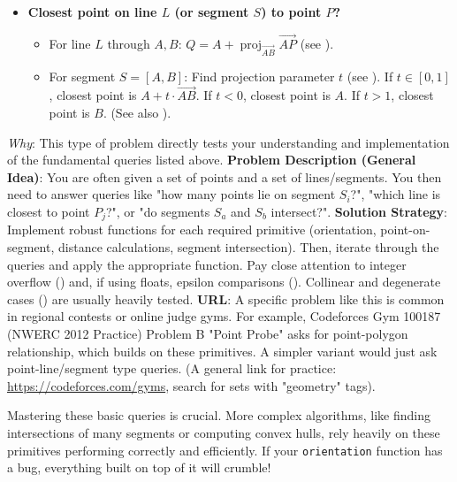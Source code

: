 \begin{pattern}
\begin{itemize}
\begin{itemize}
        \end{itemize}
    \item \textbf{Closest point on line $L$ (or segment $S$) to point $P$?}
        \begin{itemize}
            \item For line $L$ through $A,B$: $Q = A + \operatorname{proj}_{\vec{AB}} \vec{AP}$ (see ).
            \item For segment $S=[A,B]$: Find projection parameter $t$ (see ). If $t \in [0,1]$, closest point is $A + t \cdot \vec{AB}$. If $t<0$, closest point is $A$. If $t>1$, closest point is $B$. (See also ).
        \end{itemize}
    \end{itemize}
\end{pattern}

\begin{problemexample}
\label{probex:A.4.1.cf_points_lines}
\textit{Why}: This type of problem directly tests your understanding and implementation of the fundamental queries listed above.
\textbf{Problem Description (General Idea)}: You are often given a set of points and a set of lines/segments. You then need to answer queries like "how many points lie on segment $S_i$?", "which line is closest to point $P_j$?", or "do segments $S_a$ and $S_b$ intersect?".
\textbf{Solution Strategy}: Implement robust functions for each required primitive (orientation, point-on-segment, distance calculations, segment intersection). Then, iterate through the queries and apply the appropriate function. Pay close attention to integer overflow () and, if using floats, epsilon comparisons (). Collinear and degenerate cases () are usually heavily tested.
\textbf{URL}: A specific problem like this is common in regional contests or online judge gyms. For example, Codeforces Gym 100187 (NWERC 2012 Practice) Problem B "Point Probe" asks for point-polygon relationship, which builds on these primitives. A simpler variant would just ask point-line/segment type queries.
(A general link for practice: \url{https://codeforces.com/gyms}, search for sets with "geometry" tags).
\end{problemexample}

\begin{insight}
\label{insight:A.4.1.primitives_as_building_blocks}
Mastering these basic queries is crucial. More complex algorithms, like finding intersections of many segments or computing convex hulls, rely heavily on these primitives performing correctly and efficiently. If your \texttt{orientation} function has a bug, everything built on top of it will crumble!
\end{insight}

